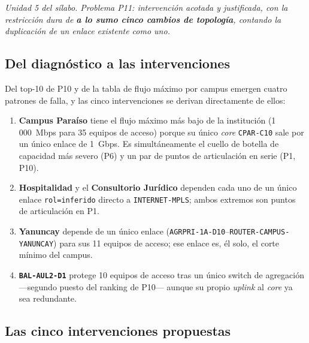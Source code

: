 \documentclass[10pt,a4paper]{extarticle}
\newcommand{\code}[1]{\texttt{\small #1}}
\begin{document}
\textit{Unidad 5 del sílabo. Problema P11: intervención acotada y justificada, con la
restricción dura de \textbf{a lo sumo cinco cambios de topología}, contando la duplicación
de un enlace existente como uno.}

\subsection{Del diagnóstico a las intervenciones}

Del top-10 de P10 y de la tabla de flujo máximo por campus emergen cuatro patrones de falla,
y las cinco intervenciones se derivan directamente de ellos:

\begin{enumerate}[label=(\alph*),leftmargin=*,itemsep=1mm]
\item \textbf{Campus Paraíso} tiene el flujo máximo más bajo de la institución
(1\,000~Mbps para 35 equipos de acceso) porque su único \textit{core} \code{CPAR-C10} sale
por un único enlace de 1~Gbps. Es simultáneamente el cuello de botella de capacidad más
severo (P6) y un par de puntos de articulación en serie (P1, P10).
\item \textbf{Hospitalidad} y el \textbf{Consultorio Jurídico} dependen cada uno de un único
enlace \code{rol=inferido} directo a \code{INTERNET-MPLS}; ambos extremos son puntos de
articulación en P1.
\item \textbf{Yanuncay} depende de un único enlace
(\code{AGRPRI-1A-D10}--\code{ROUTER-CAMPUS-YANUNCAY}) para sus 11 equipos de acceso; ese
enlace es, él solo, el corte mínimo del campus.
\item \textbf{\code{BAL-AUL2-D1}} protege 10 equipos de acceso tras un único switch de
agregación ---segundo puesto del ranking de P10--- aunque su propio \textit{uplink} al
\textit{core} ya sea redundante.
\end{enumerate}

\subsection{Las cinco intervenciones propuestas}
\end{document}
